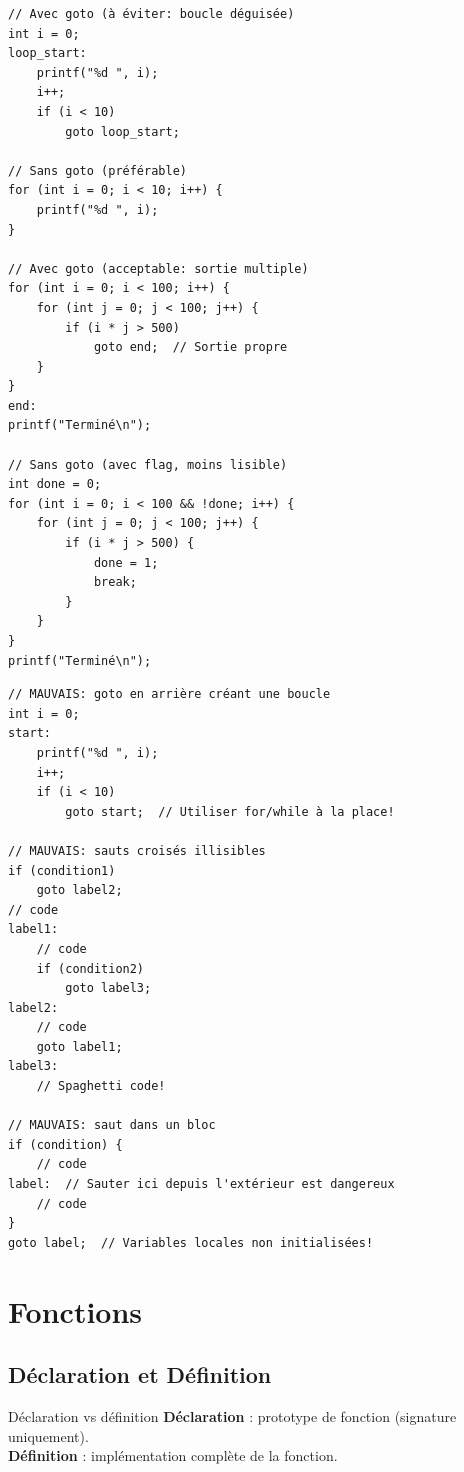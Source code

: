 \documentclass[10pt,a4paper]{article}
\begin{document}
\begin{lstlisting}[caption={Transformation goto → boucles structurées}]
// Avec goto (à éviter: boucle déguisée)
int i = 0;
loop_start:
    printf("%d ", i);
    i++;
    if (i < 10)
        goto loop_start;

// Sans goto (préférable)
for (int i = 0; i < 10; i++) {
    printf("%d ", i);
}

// Avec goto (acceptable: sortie multiple)
for (int i = 0; i < 100; i++) {
    for (int j = 0; j < 100; j++) {
        if (i * j > 500)
            goto end;  // Sortie propre
    }
}
end:
printf("Terminé\n");

// Sans goto (avec flag, moins lisible)
int done = 0;
for (int i = 0; i < 100 && !done; i++) {
    for (int j = 0; j < 100; j++) {
        if (i * j > 500) {
            done = 1;
            break;
        }
    }
}
printf("Terminé\n");
\end{lstlisting}

\begin{lstlisting}[caption={Anti-patterns avec goto}]
// MAUVAIS: goto en arrière créant une boucle
int i = 0;
start:
    printf("%d ", i);
    i++;
    if (i < 10)
        goto start;  // Utiliser for/while à la place!

// MAUVAIS: sauts croisés illisibles
if (condition1)
    goto label2;
// code
label1:
    // code
    if (condition2)
        goto label3;
label2:
    // code
    goto label1;
label3:
    // Spaghetti code!

// MAUVAIS: saut dans un bloc
if (condition) {
    // code
label:  // Sauter ici depuis l'extérieur est dangereux
    // code
}
goto label;  // Variables locales non initialisées!
\end{lstlisting}

\section{Fonctions}

\subsection{Déclaration et Définition}

\begin{definitionbox}{Déclaration vs définition}
\textbf{Déclaration} : prototype de fonction (signature uniquement).\\
\textbf{Définition} : implémentation complète de la fonction.
\end{definitionbox}
\end{document}
